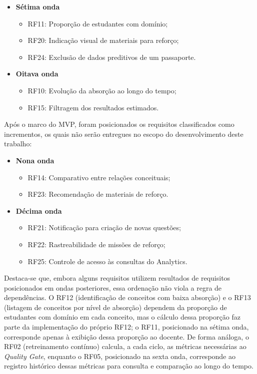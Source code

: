 \begin{itemize}
\begin{itemize}
    \end{itemize}
    \item \textbf{Sétima onda}
    \begin{itemize}
        \item RF11: Proporção de estudantes com domínio;
        \item RF20: Indicação visual de materiais para reforço;
        \item RF24: Exclusão de dados preditivos de um passaporte.
    \end{itemize}
    \item \textbf{Oitava onda}
    \begin{itemize}
        \item RF10: Evolução da absorção ao longo do tempo;
        \item RF15: Filtragem dos resultados estimados.
    \end{itemize}
\end{itemize}

Após o marco do MVP, foram posicionados os requisitos classificados como incrementos, os quais não serão entregues no escopo do desenvolvimento deste trabalho:

\begin{itemize}
    \item \textbf{Nona onda}
    \begin{itemize}
        \item RF14: Comparativo entre relações conceituais;
        \item RF23: Recomendação de materiais de reforço.
    \end{itemize}
    \item \textbf{Décima onda}
    \begin{itemize}
        \item RF21: Notificação para criação de novas questões;
        \item RF22: Rastreabilidade de missões de reforço;
        \item RF25: Controle de acesso às consultas do Analytics.
    \end{itemize}
\end{itemize}

Destaca-se que, embora alguns requisitos utilizem resultados de requisitos posicionados em ondas posteriores, essa ordenação não viola a regra de dependências. O RF12 (identificação de conceitos com baixa absorção) e o RF13 (listagem de conceitos por nível de absorção) dependem da proporção de estudantes com domínio em cada conceito, mas o cálculo dessa proporção faz parte da implementação do próprio RF12; o RF11, posicionado na sétima onda, corresponde apenas à exibição dessa proporção ao docente. De forma análoga, o RF02 (retreinamento contínuo) calcula, a cada ciclo, as métricas necessárias ao \textit{Quality Gate}, enquanto o RF05, posicionado na sexta onda, corresponde ao registro histórico dessas métricas para consulta e comparação ao longo do tempo.

